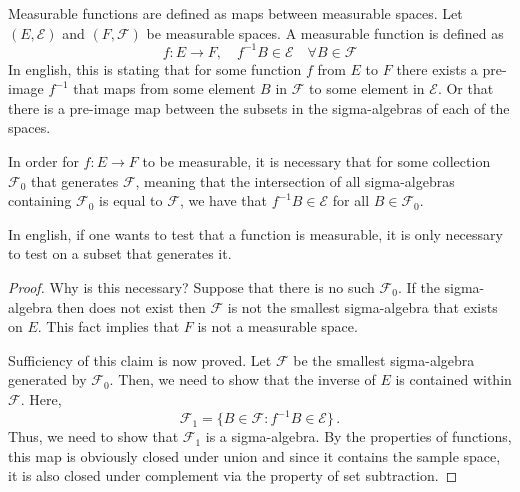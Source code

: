Measurable functions are defined as maps between measurable spaces. Let $(E, \mathcal{E})$ and $(F, \mathcal{F})$ be measurable spaces. A measurable function is defined as 
\begin{equation}
	f : E \rightarrow F, \quad f^{-1}B \in \mathcal{E} \quad \forall B \in \mathcal{F}
\end{equation}
In english, this is stating that for some function $f$ from $E$ to $F$ there exists a pre-image $f^{-1}$ that maps from some element $B$ in $\mathcal{F}$ to some element in $\mathcal{E}$. Or that there is a pre-image map between the subsets in the sigma-algebras of each of the spaces. 

In order for $f:E\rightarrow F$ to be measurable, it is necessary that for some collection $\mathcal{F}_0$ that generates $\mathcal{F}$, meaning that the intersection of all sigma-algebras containing $\mathcal{F}_0$ is equal to $\mathcal{F}$, we have that $f^{-1}B \in \mathcal{E}$ for all $B \in \mathcal{F}_0$.

In english, if one wants to test that a function is measurable, it is only necessary to test on a subset that generates it.

\begin{proof}\label{prop:2p3}
	Why is this necessary? Suppose that there is no such $\mathcal{F}_0$. If the sigma-algebra then does not exist then $\mathcal{F}$ is not the smallest sigma-algebra that exists on $E$. This fact implies that $F$ is not a measurable space. 

	Sufficiency of this claim is now proved. Let $\mathcal{F}$ be the smallest sigma-algebra generated by $\mathcal{F}_0$. Then, we need to show that the inverse of $E$ is contained within $\mathcal{F}$. Here, 
	\begin{equation}
		\mathcal{F}_1 = \{B\in \mathcal{F}: f^{-1}B \in \mathcal{E}\}\,.
	\end{equation}
	Thus, we need to show that $\mathcal{F}_1$ is a sigma-algebra. By the properties of functions, this map is obviously closed under union and since it contains the sample space, it is also closed under complement via the property of set subtraction. 
\end{proof}

